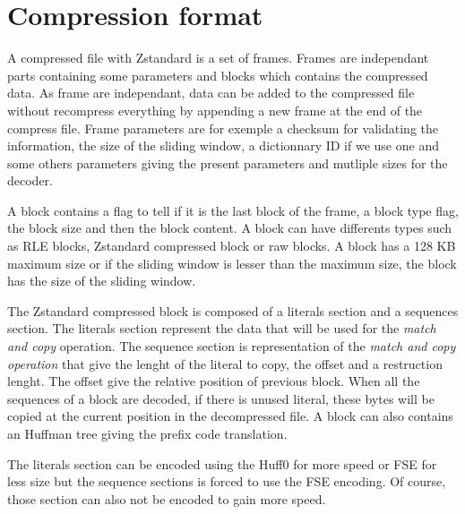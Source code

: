 \documentclass{sig-alternate-05-2015}
\begin{document}
\section{Compression format}
    A compressed file with Zstandard \cite{compress_format} is a set of frames. Frames are
    independant parts containing some parameters and blocks which contains the compressed data. As
    frame are independant, data can be added to the compressed file without recompress everything by
    appending a new frame at the end of the compress file. Frame parameters are for exemple a
    checksum for validating the information, the size of the sliding window, a dictionnary ID if we
    use one and some others parameters giving the present parameters and mutliple sizes for the
    decoder.

    A block contains a flag to tell if it is the last block of the frame, a block type flag, the
    block size and then the block content. A block can have differents types such as RLE blocks,
    Zstandard compressed block or raw blocks. A block has a 128 KB maximum size or if the sliding
    window is lesser than the maximum size, the block has the size of the sliding window.

    The Zstandard compressed block is composed of a literals section and a sequences section. The
    literals section represent the data that will be used for the \textit{match and copy} operation.
    The sequence section is representation of the \textit{match and copy operation} that give the lenght
    of the literal to copy, the offset and a restruction lenght. The offset give the relative
    position of previous block. When all the sequences of a block are decoded, if there is unused literal,
    these bytes will be copied at the current position in the decompressed file. A block can also
    contains an Huffman tree giving the prefix code translation.

    The literals section can be encoded using the Huff0 for more speed or FSE for less size but the
    sequence sections is forced to use the FSE encoding. Of course, those section can also not be
    encoded to gain more speed.
\end{document}
